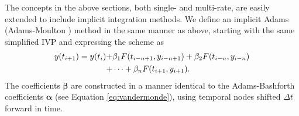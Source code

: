 The concepts in the above sections, both single- and multi-rate, are
easily extended to include implicit integration methods. We define an
implicit Adams (Adams-Moulton \cite{moulton1926new}) method in the same manner as above, starting
with the same simplified IVP  and expressing the scheme as
\begin{align}
y(t_{i+1}) = y(t_{i}) +& \beta_{1}F(t_{i-n+1},y_{i-n+1}) + \beta_{2}F(t_{i-n},y_{i-n}) \notag \\
+& \cdots + \beta_{n}F(t_{i+1},y_{i+1}). \label{eq:am_general}
\end{align}
The coefficients $\boldsymbol{\beta}$ are constructed in a manner identical to
the Adams-Bashforth coefficients $\boldsymbol{\alpha}$ (see Equation \ref{eq:vandermonde}),
using temporal nodes shifted $\Delta t$ forward in time.

